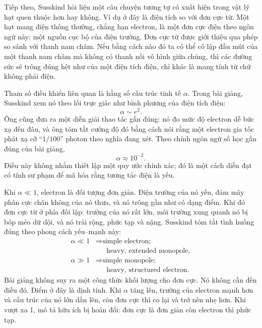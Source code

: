 Tiếp theo, Susskind hỏi liệu một câu chuyện tương tự có xuất hiện trong vật lý hạt quen thuộc hơn hay không. Ví dụ ở đây là điện tích so với đơn cực từ. Một hạt mang điện thông thường, chẳng hạn electron, là một đơn cực điện theo ngôn ngữ này: một nguồn cục bộ của điện trường. Đơn cực từ được giới thiệu qua phép so sánh với thanh nam châm. Nếu bằng cách nào đó ta có thể cô lập đầu mút của một thanh nam châm mà không có thanh nối vô hình giữa chúng, thì các đường sức sẽ trông đúng hệt như của một điện tích điện, chỉ khác là mang tính từ chứ không phải điện.

Tham số điều khiển liên quan là hằng số cấu trúc tinh tế \(\alpha\). Trong bài giảng, Susskind xem nó theo lối trực giác như bình phương của điện tích điện:
\begin{equation}
\alpha \sim e^2.
\end{equation}
Ông cũng đưa ra một diễn giải thao tác gần đúng: nó đo mức độ electron dễ bức xạ đến đâu, và ông tóm tắt cường độ đó bằng cách nói rằng một electron gia tốc phát xạ cỡ ``\(1/100\)'' photon theo nghĩa đang xét. Theo chính ngôn ngữ số học gần đúng của bài giảng,
\begin{equation}
\alpha \approx 10^{-2}.
\end{equation}
Điều này không nhằm thiết lập một quy ước chính xác; đó là một cách diễn đạt có tính sư phạm để mã hóa rằng tương tác điện là yếu.


Khi \(\alpha\ll 1\), electron là đối tượng đơn giản. Điện trường của nó yếu, đám mây phân cực chân không của nó thưa, và nó trông gần như có dạng điểm. Khi đó đơn cực từ ở phía đối lập: trường của nó rất lớn, môi trường xung quanh nó bị bóp méo dữ dội, và nó trải rộng, phức tạp và nặng. Susskind tóm tắt tình huống đúng theo phong cách yếu--mạnh này:
\begin{equation}
\begin{aligned}
\alpha \ll 1
&\Rightarrow \text{simple electron;}\\
&\phantom{\Rightarrow{}}\text{heavy, extended monopole},\\
\alpha \gg 1
&\Rightarrow \text{simple monopole;}\\
&\phantom{\Rightarrow{}}\text{heavy, structured electron}.
\end{aligned}
\end{equation}
Bài giảng không suy ra một công thức khối lượng cho đơn cực. Nó không cần đến điều đó. Điểm ở đây là định tính. Khi \(\alpha\) tăng lên, trường của electron mạnh hơn và cấu trúc của nó lớn dần lên, còn đơn cực thì co lại và trở nên nhẹ hơn. Khi vượt xa 1, mô tả hữu ích bị hoán đổi: đơn cực là đơn giản còn electron thì phức tạp.

